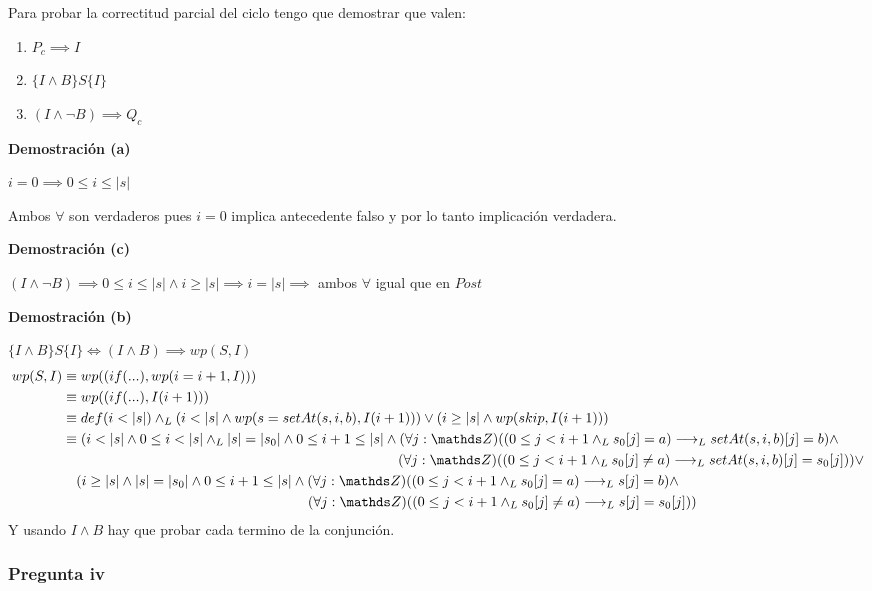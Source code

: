 Para probar la correctitud parcial del ciclo tengo que demostrar que valen:
\begin{enumerate}[label=(\alph*)]
    \item $ P_c \implies I $
    \item $ \{ I \wedge B \} S \{ I \} $
    \item $ (I \wedge \neg B) \implies Q_c $
\end{enumerate}

\textbf{Demostración (a)}

$ i = 0 \implies 0 \leq i \leq |s| $

Ambos $ \forall $ son verdaderos pues $ i = 0 $ implica antecedente falso y por lo tanto implicación verdadera.

\textbf{Demostración (c)}

$ (I \wedge \neg B) \implies 0 \leq i \leq |s| \wedge i \geq |s| \implies i = |s| \implies $ ambos $ \forall $ igual que en $Post$

\textbf{Demostración (b)}

$ \{ I \wedge B \} S \{ I \} \iff (I \wedge B) \implies wp(S, I) $
\begin{align*}
    wp(S, I) &\equiv wp((if(...), wp(i=i+1, I))) \\
    &\equiv wp((if(...), I(i+1))) \\
    &\equiv def(i < |s|) \yLuego (i < |s| \wedge wp(s=setAt(s, i, b), I(i+1))) \vee (i \geq |s| \wedge wp(skip, I(i+1))) \\
    &\equiv (i < |s| \wedge 0 \leq i < |s| \yLuego |s| = |s_0| \wedge 0 \leq i+1 \leq |s| \wedge (\forall j: \ent)((0 \leq j < i+1 \yLuego s_0[j] = a) \implicaLuego setAt(s, i, b)[j] = b) \wedge \\
    &\qquad \qquad \qquad \qquad \qquad \qquad \qquad \qquad \qquad \qquad \qquad \qquad (\forall j: \ent)((0 \leq j < i+1 \yLuego s_0[j] \neq a) \implicaLuego setAt(s, i, b)[j] = s_0[j])) \vee \\
    &\quad (i \geq |s| \wedge |s| = |s_0| \wedge 0 \leq i+1 \leq |s| \wedge (\forall j: \ent)((0 \leq j < i+1 \yLuego s_0[j] = a) \implicaLuego s[j] = b) \wedge \\
    &\qquad \qquad \qquad \qquad \qquad \qquad \qquad \qquad \quad \; \; (\forall j: \ent)((0 \leq j < i+1 \yLuego s_0[j] \neq a) \implicaLuego s[j] = s_0[j])) \\
\end{align*}
Y usando $ I \wedge B $ hay que probar cada termino de la conjunción.

\subsubsection{Pregunta iv}

